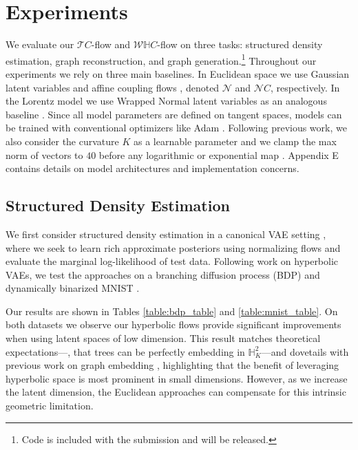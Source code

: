 \section{Experiments}
We evaluate our $\mathcal{T}C$-flow and $\mathcal{W}\mathbb{H}C$-flow on three tasks:  structured density estimation, graph reconstruction, and graph generation.\footnote{Code is included with the submission and will be released.} Throughout our experiments we rely on three main baselines. %
In Euclidean space we use Gaussian latent variables and affine coupling flows \cite{dinh2016density}, denoted $\mathcal{N}$ and $\mathcal{N}C$, respectively. In the Lorentz model we use Wrapped Normal latent variables as an analogous baseline \cite{nagano2019wrapped}. Since all model parameters are defined on tangent spaces, models can be trained with conventional optimizers like Adam \cite{kingma2014adam}. Following previous work, we also consider the curvature $K$ as a learnable parameter 
and we clamp the max norm of vectors to $40$ before any logarithmic or exponential map \cite{skopek2019mixed}. Appendix E contains details on model architectures and implementation concerns. 

\subsection{Structured Density Estimation}
We first consider structured density estimation in a canonical VAE setting \cite{kingma2013auto}, where we seek to learn rich approximate posteriors using normalizing flows and evaluate the marginal log-likelihood of test data. Following work on hyperbolic VAEs, we test the approaches on a branching diffusion process (BDP) and dynamically binarized MNIST \cite{mathieu2019continuous,skopek2019mixed}. 

Our results are shown in Tables \ref{table:bdp_table} and \ref{table:mnist_table}.
On both datasets we observe our hyperbolic flows provide significant improvements when using latent spaces of low dimension.
This result matches theoretical expectations---\eg, that trees can be perfectly embedding in $\mathbb{H}^2_K$---and dovetails with previous work on graph embedding \cite{nickel2017poincare}, highlighting that the benefit of leveraging hyperbolic space is most prominent in small dimensions. However, as we increase the latent dimension, the Euclidean approaches can compensate for this intrinsic geometric limitation.  

